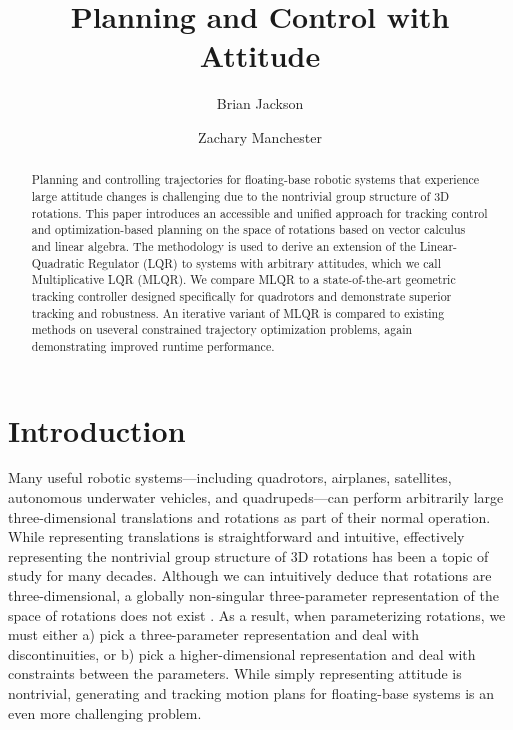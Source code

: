 \documentclass{svproc}
\begin{document}
\mainmatter              %

\title{Planning and Control with Attitude}
\author{Brian Jackson \and Zachary Manchester}


\maketitle

\begin{abstract}
Planning and controlling trajectories for floating-base robotic systems that experience large attitude changes is challenging due to the nontrivial group structure of 3D rotations. 
This paper introduces an accessible and unified approach for tracking control and optimization-based planning on the space of rotations based on vector calculus and linear algebra. The methodology is used to derive an extension of the Linear-Quadratic Regulator (LQR) to systems with arbitrary attitudes, which we call Multiplicative LQR (MLQR). 
We compare MLQR to a state-of-the-art geometric tracking controller designed specifically for quadrotors and demonstrate superior tracking and robustness. 
An iterative variant of MLQR is compared to existing methods on useveral constrained trajectory optimization problems, again demonstrating improved runtime performance. %
\end{abstract}

\section{Introduction}
    Many useful robotic systems---including quadrotors, airplanes, satellites, autonomous underwater vehicles, and quadrupeds---can perform arbitrarily large three-dimensional translations and rotations as part of their normal operation. 
    While representing translations is straightforward and intuitive, effectively representing the nontrivial group structure of 3D rotations has been a topic of study for many decades. Although we can intuitively deduce that rotations are three-dimensional, a globally non-singular three-parameter representation of the space of rotations does not exist \cite{stuelpnagel1964parametrization}. As a result, when parameterizing rotations, we must either a) pick a three-parameter representation and deal with discontinuities, or b) pick a higher-dimensional representation and deal with constraints between the parameters. While simply representing attitude is nontrivial, generating and tracking motion plans for floating-base systems is an even more challenging problem.
    
\end{document}
